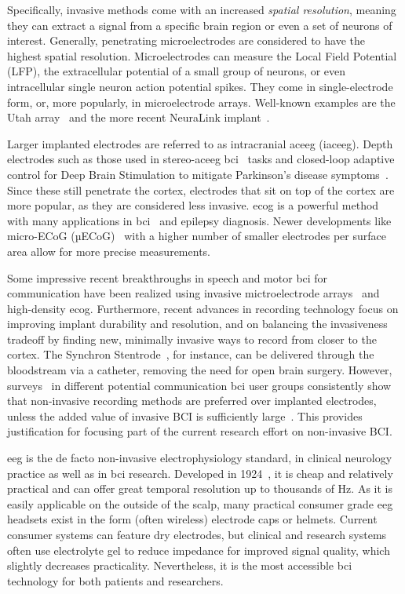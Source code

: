 Specifically, invasive methods come with an increased \emph{spatial resolution},
meaning they can extract a signal from a specific brain region or even a set of
neurons of interest.
Generally, penetrating microelectrodes are considered to have the highest
spatial resolution.
Microelectrodes can measure the Local Field Potential (LFP), the extracellular
potential of a small group of neurons, or even intracellular single neuron
action potential spikes.
They come in single-electrode form, or, more popularly, in microelectrode
arrays.
Well-known examples are the Utah array~\cite{Maynard1997} and the more recent
NeuraLink implant~\cite{Musk2019}.

Larger implanted electrodes are referred to as intracranial ac{eeg} (iac{eeg}).
Depth electrodes such as those used in stereo-ac{eeg} \ac{bci}~\cite{Wu2024} tasks
and closed-loop adaptive control for Deep Brain Stimulation to mitigate
Parkinson's disease symptoms~\cite{Arlotti2018}.
Since these still penetrate the cortex, electrodes that sit on top of the
cortex are more popular, as they are considered less invasive.
\ac{ecog} is a powerful method
with many applications in \ac{bci}~\cite{Schalk2011} and epilepsy diagnosis.
Newer developments like micro-ECoG (µECoG)~\cite{Shokoueinejad2019} with a
higher number of smaller electrodes per surface area allow for more precise
measurements.

Some impressive recent breakthroughs in speech and motor \ac{bci} for communication
 have been realized using
invasive mictroelectrode arrays~\cite{Willett2021} and high-density
\Ac{ecog}\cite{Metzger2023}.
Furthermore, recent advances in recording technology focus on improving implant
durability and resolution, and on balancing the invasiveness
tradeoff by finding new, minimally invasive ways to record from closer to the cortex.
The Synchron Stentrode~\cite{Mitchell2023}, for instance, can be delivered
through the bloodstream via a catheter, removing the need for open brain
surgery.
However, surveys~\cite{Huggins2011, Huggins2015, Branco2021} in different
potential communication \ac{bci} user groups consistently show that non-invasive
recording methods are preferred over implanted electrodes, unless the added value of invasive BCI is
sufficiently large~\cite{Kageyama2020}.
This provides justification for focusing part of the current research effort on
non-invasive BCI.

\Ac{eeg} is the de facto non-invasive electrophysiology standard, in clinical
neurology practice as well as in \ac{bci} research.
Developed in 1924~\cite{Berger1929}, it is cheap and relatively practical and
can offer great temporal resolution up to thousands of Hz.
As it is easily applicable on the outside of the scalp, many practical
consumer grade \ac{eeg} headsets exist in the form (often wireless) electrode
caps or helmets.
Current consumer systems can feature dry electrodes, but clinical and
research systems often use electrolyte gel to reduce impedance for improved signal
quality, which slightly decreases practicality.
Nevertheless, it is the most accessible \ac{bci} technology for both patients
and researchers.

